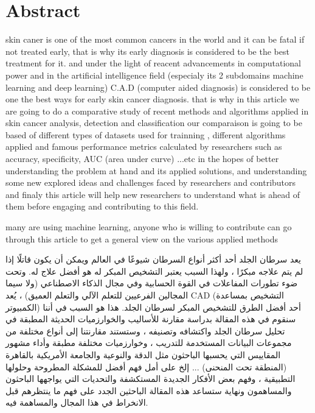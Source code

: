 \section*{Abstract}
skin caner is one of the most common cancers in the world and it can be fatal if not treated early, that is why its early diagnosis is considered to be the best treatment for it. and under the light of reacent advancements in computational power and in the artificial intelligence field (especialy its 2 subdomains machine learning and deep learning) C.A.D (computer aided diagnosis) is considered to be one the best ways for early skin cancer diagnosis. that is why in this article we are going to do a comparative study of recent methods and algorithms applied in skin cancer analysis, detection and classification our comparaison is going to be based of different types of datasets used for trainning , different algorithms applied and famous performance metrics calculated by researchers such as accuracy, specificity, AUC (area under curve) ...etc in the hopes of better understanding the problem at hand and its applied solutions, and understanding some new explored ideas and challenges faced by researchers and contributors and finaly this article will help new researchers to understand what is ahead of them before engaging and contributing to this field.

many are using machine learning, anyone who is willing to contribute can go through this article to get a general view on the various applied methods

\begin{center}
\end{center}
\begin{RLtext}

    يعد سرطان الجلد أحد أكثر أنواع السرطان شيوعًا في العالم ويمكن أن يكون قاتلًا إذا لم يتم علاجه مبكرًا ، ولهذا السبب يعتبر التشخيص المبكر له هو أفضل علاج له. وتحت ضوء تطورات المفاعلات في القوة الحسابية وفي مجال الذكاء الاصطناعي (ولا سيما المجالين الفرعيين للتعلم الآلي والتعلم العميق) ، يُعد CAD (التشخيص بمساعدة الكمبيوتر) أحد أفضل الطرق للتشخيص المبكر لسرطان الجلد. هذا هو السبب في أننا سنقوم في هذه المقالة بدراسة مقارنة للأساليب والخوارزميات الحديثة المطبقة في تحليل سرطان الجلد واكتشافه وتصنيفه ، وستستند مقارنتنا إلى أنواع مختلفة من مجموعات البيانات المستخدمة للتدريب ، وخوارزميات مختلفة مطبقة وأداء مشهور المقاييس التي يحسبها الباحثون مثل الدقة والنوعية والجامعة الأمريكية بالقاهرة (المنطقة تحت المنحنى) ... إلخ على أمل فهم أفضل للمشكلة المطروحة وحلولها التطبيقية ، وفهم بعض الأفكار الجديدة المستكشفة والتحديات التي يواجهها الباحثون والمساهمون ونهاية ستساعد هذه المقالة الباحثين الجدد على فهم ما ينتظرهم قبل الانخراط في هذا المجال والمساهمة فيه.


\end{RLtext}



